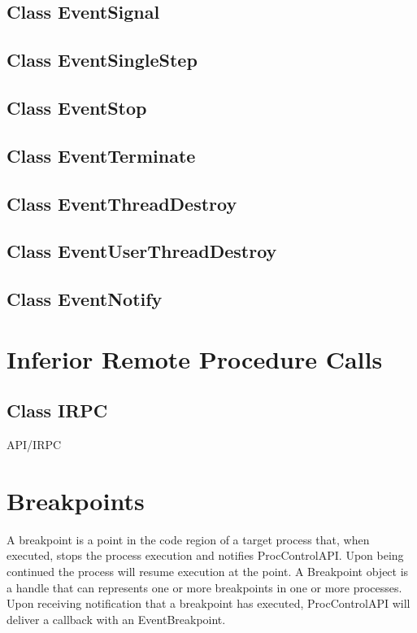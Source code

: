 \documentclass{article}
\begin{document}
  \subsection{Class EventSignal}
    

  \subsection{Class EventSingleStep}
    

  \subsection{Class EventStop}
    

  \subsection{Class EventTerminate}
    

  \subsection{Class EventThreadDestroy}
    

  \subsection{Class EventUserThreadDestroy}
    

  \subsection{Class EventNotify}
    

\section{Inferior Remote Procedure Calls}

  \subsection{Class IRPC}
     {API/IRPC}

\section{Breakpoints}
  A breakpoint is a point in the code region of a target process that,
  when executed, stops the process execution and notifies ProcControlAPI.
  Upon being continued the process will resume execution at the point. A
  Breakpoint object is a handle that can represents one or more breakpoints in
  one or more processes. Upon receiving notification that a breakpoint has
  executed, ProcControlAPI will deliver a callback with an EventBreakpoint.
\end{document}

